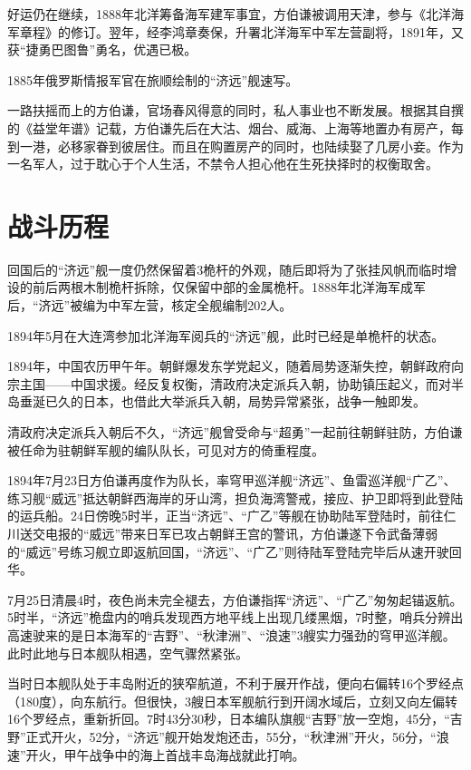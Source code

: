 \documentclass[12pt,UTF8]{ctexbook}
\begin{document}
好运仍在继续，1888年北洋筹备海军建军事宜，方伯谦被调用天津，参与《北洋海军章程》的修订。翌年，经李鸿章奏保，升署北洋海军中军左营副将，1891年，又获“捷勇巴图鲁”勇名，优遇已极。

1885年俄罗斯情报军官在旅顺绘制的“济远”舰速写。

一路扶摇而上的方伯谦，官场春风得意的同时，私人事业也不断发展。根据其自撰的《益堂年谱》记载，方伯谦先后在大沽、烟台、威海、上海等地置办有房产，每到一港，必移家眷到彼居住。而且在购置房产的同时，也陆续娶了几房小妾。作为一名军人，过于耽心于个人生活，不禁令人担心他在生死抉择时的权衡取舍。

\section{战斗历程}

回国后的“济远”舰一度仍然保留着3桅杆的外观，随后即将为了张挂风帆而临时增设的前后两根木制桅杆拆除，仅保留中部的金属桅杆。1888年北洋海军成军后，“济远”被编为中军左营，核定全舰编制202人。

1894年5月在大连湾参加北洋海军阅兵的“济远”舰，此时已经是单桅杆的状态。

1894年，中国农历甲午年。朝鲜爆发东学党起义，随着局势逐渐失控，朝鲜政府向宗主国——中国求援。经反复权衡，清政府决定派兵入朝，协助镇压起义，而对半岛垂涎已久的日本，也借此大举派兵入朝，局势异常紧张，战争一触即发。

清政府决定派兵入朝后不久，“济远”舰曾受命与“超勇”一起前往朝鲜驻防，方伯谦被任命为驻朝鲜军舰的编队队长，可见对方的倚重程度。

1894年7月23日方伯谦再度作为队长，率穹甲巡洋舰“济远”、鱼雷巡洋舰“广乙”、练习舰“威远”抵达朝鲜西海岸的牙山湾，担负海湾警戒，接应、护卫即将到此登陆的运兵船。24日傍晚5时半，正当“济远”、“广乙”等舰在协助陆军登陆时，前往仁川送交电报的“威远”带来日军已攻占朝鲜王宫的警讯，方伯谦遂下令武备薄弱的“威远”号练习舰立即返航回国，“济远”、“广乙”则待陆军登陆完毕后从速开驶回华。

7月25日清晨4时，夜色尚未完全褪去，方伯谦指挥“济远”、“广乙”匆匆起锚返航。5时半，“济远”桅盘内的哨兵发现西方地平线上出现几缕黑烟，7时整，哨兵分辨出高速驶来的是日本海军的“吉野”、“秋津洲”、“浪速”3艘实力强劲的穹甲巡洋舰。此时此地与日本舰队相遇，空气骤然紧张。

当时日本舰队处于丰岛附近的狭窄航道，不利于展开作战，便向右偏转16个罗经点（180度），向东航行。但很快，3艘日本军舰航行到开阔水域后，立刻又向左偏转16个罗经点，重新折回。7时43分30秒，日本编队旗舰“吉野”放一空炮，45分，“吉野”正式开火，52分，“济远”舰开始发炮还击，55分，“秋津洲”开火，56分，“浪速”开火，甲午战争中的海上首战丰岛海战就此打响。
\end{document}
